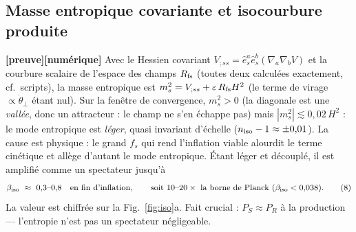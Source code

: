 \documentclass[11pt,a4paper]{article}
\newcommand{\st}[1]{\textbf{\textcolor{blue!45!black}{[#1]}}}
\begin{document}
\subsection{Masse entropique covariante et isocourbure produite}
\st{preuve}\st{numérique} Avec le Hessien covariant $V_{;ss}=\hat e_s^a\hat e_s^b(\nabla_a\nabla_b V)$ et la courbure scalaire de l'espace des champs $R_{\rm fs}$ (toutes deux calculées exactement, cf.\ scripts), la masse entropique est $m^2_s=V_{;ss}+\varepsilon\,R_{\rm fs}H^2$ (le terme de virage $\propto\dot\theta_\perp$ étant nul). Sur la fenêtre de convergence, $m^2_s>0$ (la diagonale est une \emph{vallée}, donc un attracteur : le champ ne s'en échappe pas) mais $|m^2_s|\lesssim0{,}02\,H^2$ : le mode entropique est \emph{léger}, quasi invariant d'échelle ($n_{\rm iso}-1\approx\pm0{,}01$). La cause est physique : le grand $f_s$ qui rend l'inflation viable alourdit le terme cinétique et allège d'autant le mode entropique. Étant léger et découplé, il est amplifié comme un spectateur jusqu'à
\begin{equation}
\beta_{\rm iso}\ \approx\ 0{,}3\text{–}0{,}8\quad\text{en fin d'inflation},\qquad\text{soit }10\text{–}20\times\text{ la borne de Planck }(\beta_{\rm iso}<0{,}038). \tag{8}
\end{equation}
La valeur est chiffrée sur la Fig.~\ref{fig:iso}a. Fait crucial : $P_S\approx P_R$ à la production — l'entropie n'est pas un spectateur négligeable.
\end{document}
